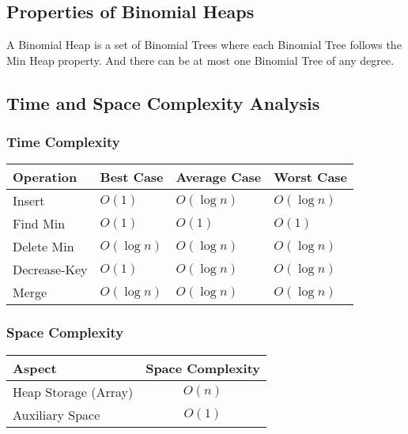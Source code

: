 \documentclass[a4paper,10pt]{article}
\begin{document}
\subsection{Properties of Binomial Heaps}
A Binomial Heap is a set of Binomial Trees where each Binomial Tree follows the Min Heap property. And there can be at most one Binomial Tree of any degree. 

\subsection{Time and Space Complexity Analysis}

\subsubsection*{Time Complexity}
\begin{table}[H]
    \raggedright
    \begin{tabular}{|l|l|l|l|}
    \hline
    \textbf{Operation} & \textbf{Best Case} & \textbf{Average Case} & \textbf{Worst Case} \\ \hline
    Insert             & $O(1)$             & $O(\log n)$           & $O(\log n)$         \\ \hline
    Find Min           & $O(1)$             & $O(1)$                & $O(1)$              \\ \hline
    Delete Min         & $O(\log n)$        & $O(\log n)$           & $O(\log n)$         \\ \hline
    Decrease-Key       & $O(1)$             & $O(\log n)$           & $O(\log n)$         \\ \hline
    Merge              & $O(\log n)$        & $O(\log n)$           & $O(\log n)$         \\ \hline
    \end{tabular}
\end{table}
    

\subsubsection*{Space Complexity}
\begin{table}[H]
    \raggedright
    \begin{tabular}{|l|c|}
    \hline
    \textbf{Aspect}         & \textbf{Space Complexity} \\ \hline
    Heap Storage (Array)    & $O(n)$                    \\ \hline
    Auxiliary Space         & $O(1)$                    \\ \hline
    \end{tabular}
\end{table}
\end{document}
